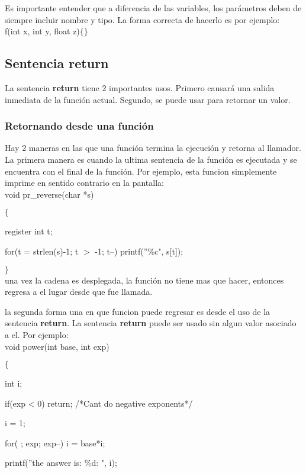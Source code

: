 \documentclass[]{article}
\begin{document}
	Es importante entender que a diferencia de las variables, los parámetros deben de siempre incluir nombre y tipo. La forma correcta de hacerlo es por ejemplo:\\
	
	f(int x, int y, float z)$\lbrace$$\rbrace$
	
	\subsection{Sentencia return}
	
	La sentencia \textbf{return} tiene 2 importantes usos. Primero causará una salida inmediata de la función actual. Segundo, se puede usar para retornar un valor.
	
	\subsubsection{Retornando desde una función}
	
	Hay 2 maneras en las que una función termina la ejecución y retorna al llamador. La primera manera es cuando la ultima sentencia de la función es ejecutada y se encuentra con el final de la función. Por ejemplo, esta funcion simplemente imprime en sentido contrario en la pantalla:\\
	
	void pr\_reverse(char *s)
	
	$\lbrace$
	
	register int t;
	
	for(t = strlen(s)-1; t $>$ -1; t--) printf(''\%c", s[t]);
	
	$\rbrace$\\
	
	una vez la cadena es desplegada, la función no tiene mas que hacer, entonces regresa a el lugar desde que fue llamada.
	
	la segunda forma una en que funcion puede regresar es desde el uso de la sentencia \textbf{return}. La sentencia \textbf{return} puede ser usado sin algun valor asociado a el. Por ejemplo:\\
	
	void power(int base, int exp)
	
	$\lbrace$
	
	int i;
	
	if(exp < 0) return; /*Cant do negative exponents*/
	
	i = 1;
	
	for( ; exp; exp--) i = base*i;
	
	printf(''the answer is: \%d: ", i);
	
\end{document}
